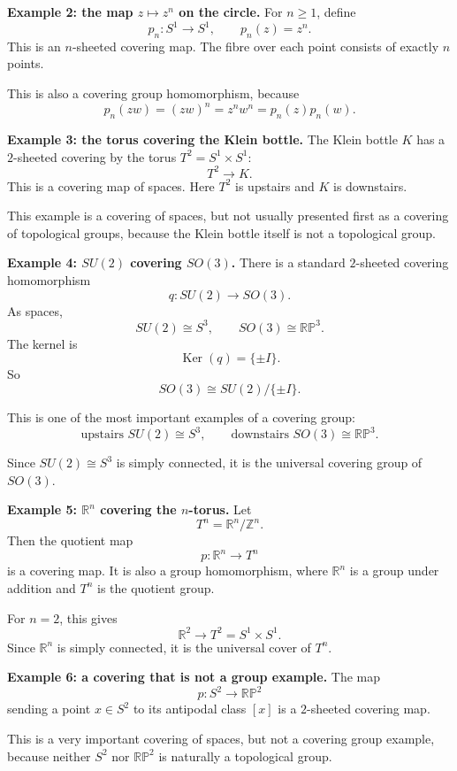 \documentclass[12pt,a4paper]{article}
\theoremstyle{notespace}
\DeclareMathOperator{\Ker}{Ker}
\begin{document}
\medskip

\textbf{Example 2: the map \(z\mapsto z^n\) on the circle.}
For \(n\ge 1\), define
\[
p_n:S^1\to S^1,
\qquad
p_n(z)=z^n.
\]
This is an \(n\)-sheeted covering map. The fibre over each point consists of exactly \(n\) points.

This is also a covering group homomorphism, because
\[
p_n(zw)=(zw)^n=z^n w^n=p_n(z)p_n(w).
\]

\medskip

\textbf{Example 3: the torus covering the Klein bottle.}
The Klein bottle \(K\) has a \(2\)-sheeted covering by the torus \(T^2=S^1\times S^1\):
\[
T^2\to K.
\]
This is a covering map of spaces. Here \(T^2\) is upstairs and \(K\) is downstairs.

This example is a covering of spaces, but not usually presented first as a covering of topological groups, because the Klein bottle itself is not a topological group.

\medskip

\textbf{Example 4: \(SU(2)\) covering \(SO(3)\).}
There is a standard \(2\)-sheeted covering homomorphism
\[
q:SU(2)\to SO(3).
\]
As spaces,
\[
SU(2)\cong S^3,
\qquad
SO(3)\cong \mathbb{RP}^3.
\]
The kernel is
\[
\Ker(q)=\{\pm I\}.
\]
So
\[
SO(3)\cong SU(2)/\{\pm I\}.
\]

This is one of the most important examples of a covering group:
\[
\text{upstairs } SU(2)\cong S^3,
\qquad
\text{downstairs } SO(3)\cong \mathbb{RP}^3.
\]

Since \(SU(2)\cong S^3\) is simply connected, it is the universal covering group of \(SO(3)\).

\medskip

\textbf{Example 5: \(\mathbb R^n\) covering the \(n\)-torus.}
Let
\[
T^n=\mathbb R^n/\mathbb Z^n.
\]
Then the quotient map
\[
p:\mathbb R^n\to T^n
\]
is a covering map. It is also a group homomorphism, where \(\mathbb R^n\) is a group under addition and \(T^n\) is the quotient group.

For \(n=2\), this gives
\[
\mathbb R^2\to T^2=S^1\times S^1.
\]
Since \(\mathbb R^n\) is simply connected, it is the universal cover of \(T^n\).

\medskip

\textbf{Example 6: a covering that is not a group example.}
The map
\[
p:S^2\to \mathbb{RP}^2
\]
sending a point \(x\in S^2\) to its antipodal class \([x]\) is a \(2\)-sheeted covering map.

This is a very important covering of spaces, but not a covering group example, because neither \(S^2\) nor \(\mathbb{RP}^2\) is naturally a topological group.
\end{document}
